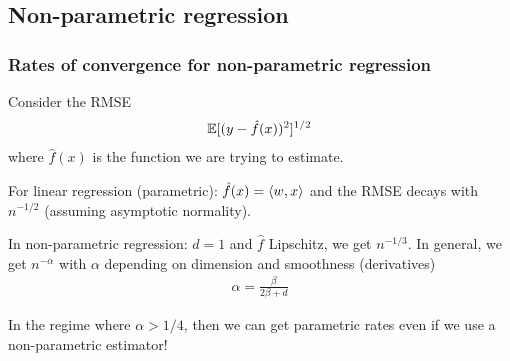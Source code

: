 \subsection{Non-parametric regression}

\subsubsection{Rates of convergence for non-parametric regression}

Consider the RMSE
\begin{align}
  \mathbb{E}[(y - \hat{f}(x))^2]^{1/2}
\end{align}
where $\hat{f}(x)$ is the function we are trying to estimate.

For linear regression (parametric): $\hat{f}(x) = \braket{w,x}$
and the RMSE decays with $n^{-1/2}$ (assuming asymptotic normality).

In non-parametric regression: $d=1$ and $\hat{f}$ Lipschitz, we get
$n^{-1/3}$. In general, we get $n^{-\alpha}$ with $\alpha$ depending on
dimension and smoothness (derivatives)
\begin{align}
  \alpha = \frac{\beta}{2\beta + d}
\end{align}

In the regime where $\alpha > 1/4$, then we can get parametric rates even
if we use a non-parametric estimator!
